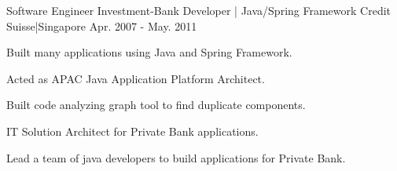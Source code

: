 \begin{cventries}
{\begin{cvitems}
      \end{cvitems}
    }
  \cventry
    {Software Engineer}
    {Investment-Bank Developer | Java/Spring Framework}
    {Credit Suisse|Singapore}
    {Apr. 2007 - May. 2011}
    {
      \begin{cvitems}
        \item {Built many applications using Java and Spring Framework.}
        \item {Acted as APAC Java Application Platform Architect.}
        \item {Built code analyzing graph tool to find duplicate components.}
        \item {IT Solution Architect for Private Bank applications.}
        \item {Lead a team of java developers to build applications for Private Bank.}
      \end{cvitems}
    }
\end{cventries}
